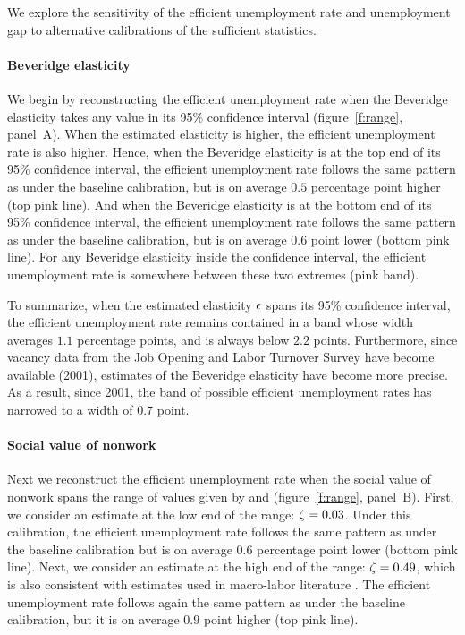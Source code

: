 \documentclass[letterpaper,12pt,leqno]{article}
\begin{document}
We explore the sensitivity of the efficient unemployment rate and unemployment gap to alternative calibrations of the sufficient statistics. 

\paragraph{Beveridge elasticity} We begin by reconstructing the efficient unemployment rate when the Beveridge elasticity takes any value in its 95\% confidence interval (figure~\ref{f:range}, panel~A). When the estimated elasticity is higher, the efficient unemployment rate is also higher. Hence, when the Beveridge elasticity is at the top end of its 95\% confidence interval, the efficient unemployment rate follows the same pattern as under the baseline calibration, but is on average $0.5$ percentage point higher (top pink line). And when the Beveridge elasticity is at the bottom end of its 95\% confidence interval, the efficient unemployment rate follows the same pattern as under the baseline calibration, but is on average $0.6$ point lower (bottom pink line). For any Beveridge elasticity inside the confidence interval, the efficient unemployment rate is somewhere between these two extremes (pink band).

To summarize, when the estimated elasticity $\epsilon$ spans its 95\% confidence interval, the efficient unemployment rate remains contained in a band whose width averages $1.1$ percentage points, and is always below $2.2$ points. Furthermore, since vacancy data from the Job Opening and Labor Turnover Survey have become available (2001), estimates of the Beveridge elasticity have become more precise. As a result, since 2001, the band of possible efficient unemployment rates has narrowed to a width of $0.7$ point.

\paragraph{Social value of nonwork} Next we reconstruct the efficient unemployment rate when the social value of nonwork spans the range of values given by  and  (figure~\ref{f:range}, panel~B). First, we consider an estimate at the low end of the range: $\zeta=0.03$. Under this calibration, the efficient unemployment rate follows the same pattern as under the baseline calibration but is on average $0.6$ percentage point lower (bottom pink line). Next, we consider an estimate at the high end of the range: $\zeta=0.49$, which is also consistent with estimates used in macro-labor literature . The efficient unemployment rate follows again the same pattern as under the baseline calibration, but it is on average $0.9$ point higher (top pink line).
\end{document}

